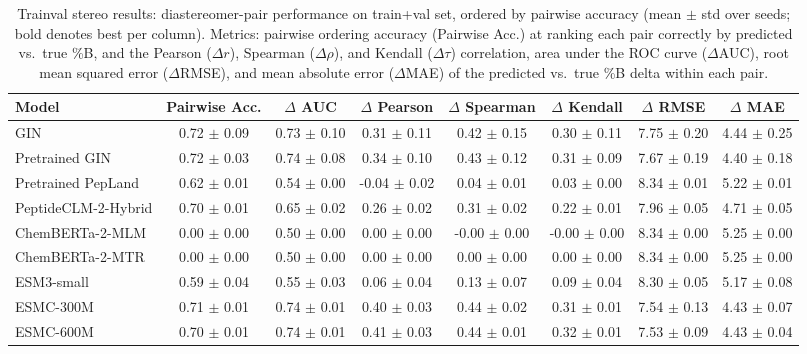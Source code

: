 \begin{table}[htbp]
  \caption{Trainval stereo results: diastereomer-pair performance on train+val set, ordered by pairwise accuracy (mean $\pm$ std over seeds; bold denotes best per column). Metrics: pairwise ordering accuracy (Pairwise Acc.) at ranking each pair correctly by predicted vs.\ true \%B, and the Pearson ($\Delta r$), Spearman ($\Delta\rho$), and Kendall ($\Delta\tau$) correlation, area under the ROC curve ($\Delta$AUC), root mean squared error ($\Delta$RMSE), and mean absolute error ($\Delta$MAE) of the predicted vs.\ true \%B delta within each pair.}
  \label{tab:trainval_stereo_results}
  \centering
  \scriptsize
  \setlength{\tabcolsep}{6pt}
  \begin{tabular}{lccccccc}
    \toprule
    \textbf{Model} & \textbf{Pairwise Acc.} & \textbf{$\Delta$ AUC} & \textbf{$\Delta$ Pearson} & \textbf{$\Delta$ Spearman} & \textbf{$\Delta$ Kendall} & \textbf{$\Delta$ RMSE} & \textbf{$\Delta$ MAE} \\
    \midrule
    GIN & 0.72 $\pm$ 0.09 & 0.73 $\pm$ 0.10 & 0.31 $\pm$ 0.11 & 0.42 $\pm$ 0.15 & 0.30 $\pm$ 0.11 & 7.75 $\pm$ 0.20 & 4.44 $\pm$ 0.25 \\
    Pretrained GIN & 0.72 $\pm$ 0.03 & 0.74 $\pm$ 0.08 & 0.34 $\pm$ 0.10 & 0.43 $\pm$ 0.12 & 0.31 $\pm$ 0.09 & 7.67 $\pm$ 0.19 & 4.40 $\pm$ 0.18 \\
    Pretrained PepLand & 0.62 $\pm$ 0.01 & 0.54 $\pm$ 0.00 & -0.04 $\pm$ 0.02 & 0.04 $\pm$ 0.01 & 0.03 $\pm$ 0.00 & 8.34 $\pm$ 0.01 & 5.22 $\pm$ 0.01 \\
    PeptideCLM-2-Hybrid & 0.70 $\pm$ 0.01 & 0.65 $\pm$ 0.02 & 0.26 $\pm$ 0.02 & 0.31 $\pm$ 0.02 & 0.22 $\pm$ 0.01 & 7.96 $\pm$ 0.05 & 4.71 $\pm$ 0.05 \\
    ChemBERTa-2-MLM & 0.00 $\pm$ 0.00 & 0.50 $\pm$ 0.00 & 0.00 $\pm$ 0.00 & -0.00 $\pm$ 0.00 & -0.00 $\pm$ 0.00 & 8.34 $\pm$ 0.00 & 5.25 $\pm$ 0.00 \\
    ChemBERTa-2-MTR & 0.00 $\pm$ 0.00 & 0.50 $\pm$ 0.00 & 0.00 $\pm$ 0.00 & 0.00 $\pm$ 0.00 & 0.00 $\pm$ 0.00 & 8.34 $\pm$ 0.00 & 5.25 $\pm$ 0.00 \\
    ESM3-small & 0.59 $\pm$ 0.04 & 0.55 $\pm$ 0.03 & 0.06 $\pm$ 0.04 & 0.13 $\pm$ 0.07 & 0.09 $\pm$ 0.04 & 8.30 $\pm$ 0.05 & 5.17 $\pm$ 0.08 \\
    ESMC-300M & 0.71 $\pm$ 0.01 & 0.74 $\pm$ 0.01 & 0.40 $\pm$ 0.03 & 0.44 $\pm$ 0.02 & 0.31 $\pm$ 0.01 & 7.54 $\pm$ 0.13 & 4.43 $\pm$ 0.07 \\
    ESMC-600M & 0.70 $\pm$ 0.01 & 0.74 $\pm$ 0.01 & 0.41 $\pm$ 0.03 & 0.44 $\pm$ 0.01 & 0.32 $\pm$ 0.01 & 7.53 $\pm$ 0.09 & 4.43 $\pm$ 0.04 \\

\end{tabular}
\end{table}
